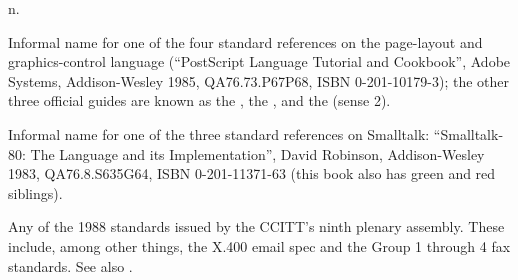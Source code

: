  n.

\begin{inparaenum}
\item Informal name for one of the four standard references on the page-layout
    and graphics-control language  (``PostScript Language
    Tutorial and Cookbook'', Adobe Systems, Addison-Wesley 1985, QA76.73.P67P68,
    ISBN 0-201-10179-3); the other three official guides are known as the
    , the , and the  (sense 2).
\item Informal name for one of the three standard references on Smalltalk:
    ``Smalltalk-80: The Language and its Implementation'', David Robinson,
    Addison-Wesley 1983, QA76.8.S635G64, ISBN 0-201-11371-63 (this book also has
    green and red siblings).
\item Any of the 1988 standards issued by the CCITT's ninth plenary assembly.
    These include, among other things, the X.400 email spec and the Group 1
    through 4 fax standards. See also .
\end{inparaenum}


